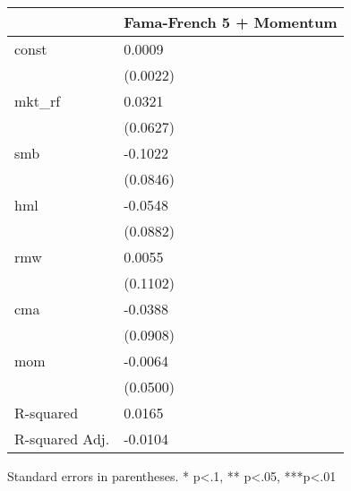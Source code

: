 \begin{table}
\caption{}
\label{}
\begin{center}
\begin{tabular}{ll}
\hline
               & Fama-French 5 + Momentum  \\
\hline
const          & 0.0009                    \\
               & (0.0022)                  \\
mkt\_rf        & 0.0321                    \\
               & (0.0627)                  \\
smb            & -0.1022                   \\
               & (0.0846)                  \\
hml            & -0.0548                   \\
               & (0.0882)                  \\
rmw            & 0.0055                    \\
               & (0.1102)                  \\
cma            & -0.0388                   \\
               & (0.0908)                  \\
mom            & -0.0064                   \\
               & (0.0500)                  \\
R-squared      & 0.0165                    \\
R-squared Adj. & -0.0104                   \\
\hline
\end{tabular}
\end{center}
\end{table}
\bigskip
Standard errors in parentheses. \newline 
* p<.1, ** p<.05, ***p<.01